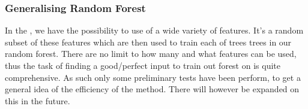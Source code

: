 
\subsubsection{Generalising Random Forest}
In the , we have the possibility to use of a wide variety of features. It's a random subset of these features which are then used to train each of trees trees in our random forest. There are no limit to how many and what features can be used, thus the task of finding a good/perfect input to train out forest on is quite comprehensive. As such only some preliminary tests have been perform, to get a general idea of the efficiency of the method. There will however be expanded on this in the future.

